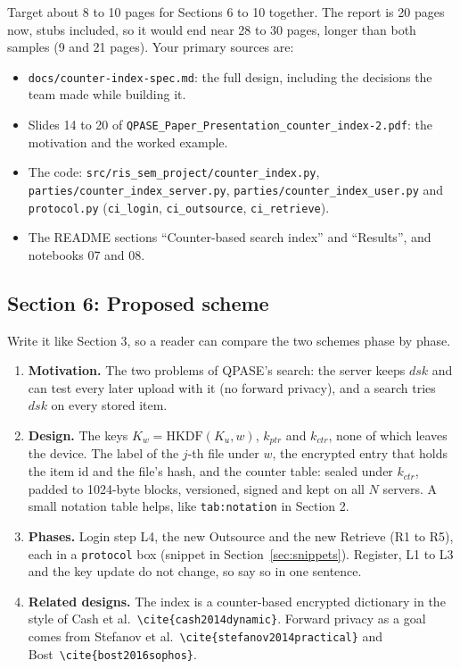 \documentclass[11pt,a4paper]{article}
\newcommand{\file}[1]{\texttt{#1}}
\begin{document}
Target about 8 to 10 pages for Sections 6 to 10 together. The report is 20 pages now, stubs included, so it would
end near 28 to 30 pages, longer than both samples (9 and 21 pages). Your primary sources are:
\begin{itemize}
  \item \file{docs/counter-index-spec.md}: the full design, including the decisions the team made while building it.
  \item Slides 14 to 20 of \file{QPASE\_Paper\_Presentation\_counter\_index-2.pdf}: the motivation and the worked
        example.
  \item The code: \file{src/ris\_sem\_project/counter\_index.py}, \file{parties/counter\_index\_server.py},
        \file{parties/counter\_index\_user.py} and \file{protocol.py} (\file{ci\_login}, \file{ci\_outsource},
        \file{ci\_retrieve}).
  \item The README sections ``Counter-based search index'' and ``Results'', and notebooks 07 and 08.
\end{itemize}

\subsection{Section 6: Proposed scheme}

Write it like Section 3, so a reader can compare the two schemes phase by phase.
\begin{enumerate}
  \item \textbf{Motivation.} The two problems of QPASE's search: the server keeps $\mathit{dsk}$ and can test every
        later upload with it (no forward privacy), and a search tries $\mathit{dsk}$ on every stored item.
  \item \textbf{Design.} The keys $K_w = \mathrm{HKDF}(K_u, w)$, $k_{ptr}$ and $k_{ctr}$, none of which leaves the
        device. The label of the $j$-th file under $w$, the encrypted entry that holds the item id and the file's
        hash, and the counter table: sealed under $k_{ctr}$, padded to 1024-byte blocks, versioned, signed and kept
        on all $N$ servers. A small notation table helps, like \texttt{tab:notation} in Section 2.
  \item \textbf{Phases.} Login step L4, the new Outsource and the new Retrieve (R1 to R5), each in a
        \texttt{protocol} box (snippet in Section~\ref{sec:snippets}). Register, L1 to L3 and the key update do not change,
        so say so in one sentence.
  \item \textbf{Related designs.} The index is a counter-based encrypted dictionary in the style of Cash et
        al.~\verb|\cite{cash2014dynamic}|. Forward privacy as a goal comes from Stefanov et
        al.~\verb|\cite{stefanov2014practical}| and Bost~\verb|\cite{bost2016sophos}|.
\end{enumerate}
\end{document}
